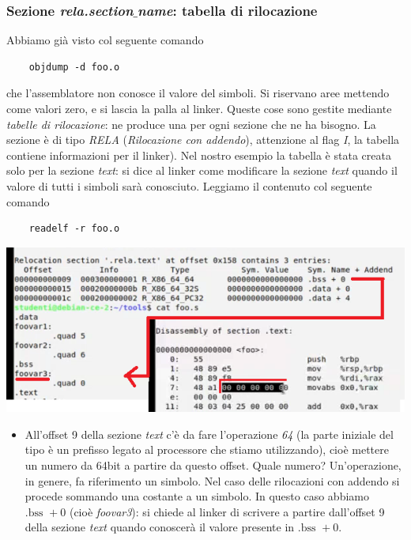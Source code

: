 \subsubsection{Sezione \emph{rela.section$\_$name}: tabella di rilocazione} Abbiamo già visto col seguente comando
\begin{verbatim}
	objdump -d foo.o
\end{verbatim}
che l'assemblatore non conosce il valore del simboli. Si riservano aree mettendo come valori zero, e si lascia la palla al linker. Queste cose sono gestite mediante \emph{tabelle di rilocazione}: ne produce una per ogni sezione che ne ha bisogno. La sezione è di tipo \emph{RELA} (\emph{Rilocazione con addendo}), attenzione al flag \emph{I}, la tabella contiene informazioni per il linker). Nel nostro esempio la tabella è stata creata solo per la sezione \emph{text}: si dice al linker come modificare la sezione \emph{text} quando il valore di tutti i simboli sarà conosciuto. Leggiamo il contenuto col seguente comando
\begin{verbatim}
	readelf -r foo.o
\end{verbatim}
\begin{center}
	\includegraphics{img/57.PNG}
\end{center}  
\begin{itemize}
	\item All'offset 9 della sezione \emph{text} c'è da fare l'operazione \emph{64} (la parte iniziale del tipo è un prefisso legato al processore che stiamo utilizzando), cioè mettere un numero da 64bit a partire da questo offset. Quale numero? Un'operazione, in genere, fa riferimento un simbolo. Nel caso delle rilocazioni con addendo si procede sommando una costante a un simbolo. In questo caso abbiamo $\text{.bss } + 0$ (cioè \emph{foovar3}): si chiede al linker di scrivere a partire dall'offset 9 della sezione \emph{text} quando conoscerà il valore presente in $\text{.bss } + 0$.
\end{itemize}
